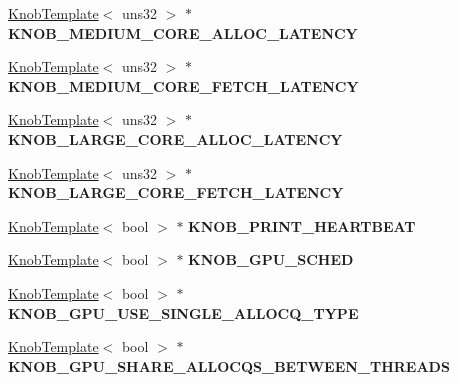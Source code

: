 \begin{DoxyCompactItemize}
\item 
\hypertarget{classall__knobs__c_a359cc29d7f55c97bdc799bb09130a992}{
\hyperlink{classKnobTemplate}{KnobTemplate}$<$ uns32 $>$ $\ast$ {\bfseries KNOB\_\-MEDIUM\_\-CORE\_\-ALLOC\_\-LATENCY}}
\label{classall__knobs__c_a359cc29d7f55c97bdc799bb09130a992}

\item 
\hypertarget{classall__knobs__c_abbf3f292031a1092d28a7925078fea9e}{
\hyperlink{classKnobTemplate}{KnobTemplate}$<$ uns32 $>$ $\ast$ {\bfseries KNOB\_\-MEDIUM\_\-CORE\_\-FETCH\_\-LATENCY}}
\label{classall__knobs__c_abbf3f292031a1092d28a7925078fea9e}

\item 
\hypertarget{classall__knobs__c_a7fa78d42e21da8818c4baf518e43a6af}{
\hyperlink{classKnobTemplate}{KnobTemplate}$<$ uns32 $>$ $\ast$ {\bfseries KNOB\_\-LARGE\_\-CORE\_\-ALLOC\_\-LATENCY}}
\label{classall__knobs__c_a7fa78d42e21da8818c4baf518e43a6af}

\item 
\hypertarget{classall__knobs__c_a3a328b57d6862c69d6ca6b476ab3ad80}{
\hyperlink{classKnobTemplate}{KnobTemplate}$<$ uns32 $>$ $\ast$ {\bfseries KNOB\_\-LARGE\_\-CORE\_\-FETCH\_\-LATENCY}}
\label{classall__knobs__c_a3a328b57d6862c69d6ca6b476ab3ad80}

\item 
\hypertarget{classall__knobs__c_a9c676a5585857c4cdde93bc83bff302c}{
\hyperlink{classKnobTemplate}{KnobTemplate}$<$ bool $>$ $\ast$ {\bfseries KNOB\_\-PRINT\_\-HEARTBEAT}}
\label{classall__knobs__c_a9c676a5585857c4cdde93bc83bff302c}

\item 
\hypertarget{classall__knobs__c_a8932ac814dca5dccbb4be4d569776d3f}{
\hyperlink{classKnobTemplate}{KnobTemplate}$<$ bool $>$ $\ast$ {\bfseries KNOB\_\-GPU\_\-SCHED}}
\label{classall__knobs__c_a8932ac814dca5dccbb4be4d569776d3f}

\item 
\hypertarget{classall__knobs__c_af4565ded46d7861457aa447e703703b1}{
\hyperlink{classKnobTemplate}{KnobTemplate}$<$ bool $>$ $\ast$ {\bfseries KNOB\_\-GPU\_\-USE\_\-SINGLE\_\-ALLOCQ\_\-TYPE}}
\label{classall__knobs__c_af4565ded46d7861457aa447e703703b1}

\item 
\hypertarget{classall__knobs__c_a421f9130305ec9d9b7a47ca881349a45}{
\hyperlink{classKnobTemplate}{KnobTemplate}$<$ bool $>$ $\ast$ {\bfseries KNOB\_\-GPU\_\-SHARE\_\-ALLOCQS\_\-BETWEEN\_\-THREADS}}
\label{classall__knobs__c_a421f9130305ec9d9b7a47ca881349a45}


\end{DoxyCompactItemize}
